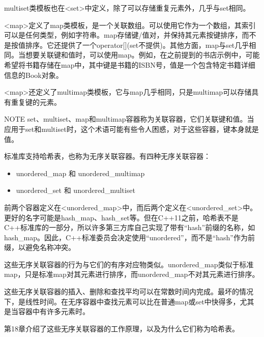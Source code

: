 
multiset类模板也在<set>中定义，除了可以存储重复元素外，几乎与set相同。


<map>定义了map类模板，是一个关联数组。可以使用它作为一个数组，其索引可以是任何类型，例如字符串。map存储键/值对，并保持其元素按键排序，而不是按值排序。它还提供了一个operator[](set不提供)。其他方面，map与set几乎相同。当想要关联键和值时，可以使用map。例如，在之前提到的书店示例中，可能希望将书籍存储在map中，其中键是书籍的ISBN号，值是一个包含特定书籍详细信息的Book对象。


<map>还定义了multimap类模板，它与map几乎相同，只是multimap可以存储具有重复键的元素。

\begin{myNotic}{NOTE}
set、multiset、map和multimap容器称为关联容器，它们关联键和值。当应用于set和multiset时，这个术语可能有些令人困惑，对于这些容器，键本身就是值。
\end{myNotic}


标准库支持哈希表，也称为无序关联容器。有四种无序关联容器：

\begin{itemize}
\item
unordered\_map 和 unordered\_multimap

\item
unordered\_set 和 unordered\_multiset
\end{itemize}

前两个容器定义在<unordered\_map>中，而后两个定义在<unordered\_set>中。更好的名字可能是hash\_map、hash\_set等。但在C++11之前，哈希表不是C++标准库的一部分，所以许多第三方库自己实现了带有“hash”前缀的名称，如hash\_map。因此，C++标准委员会决定使用“unordered”，而不是“hash”作为前缀，以避免名称冲突。

这些无序关联容器的行为与它们的有序对应物类似。unordered\_map类似于标准map，只是标准map对其元素进行排序，而unordered\_map不对其元素进行排序。

这些无序关联容器的插入、删除和查找平均可以在常数时间内完成。最坏的情况下，是线性时间。在无序容器中查找元素可以比在普通map或set中快得多，尤其是当容器中有许多元素时。

第18章介绍了这些无序关联容器的工作原理，以及为什么它们称为哈希表。



